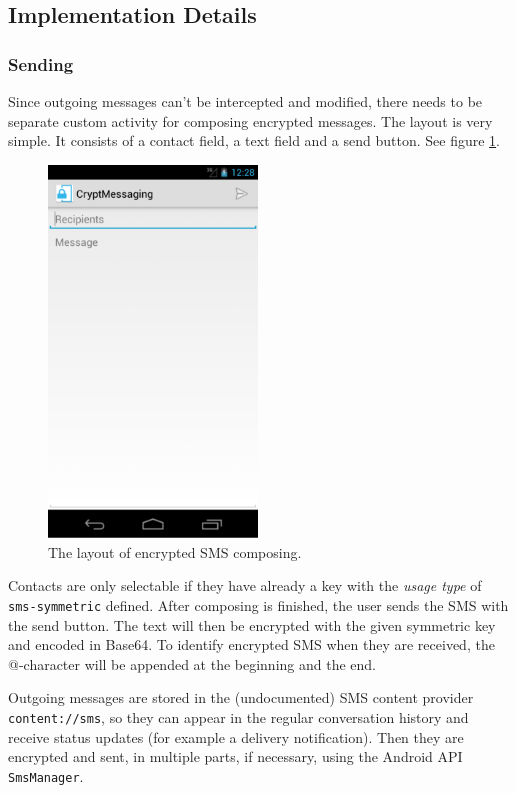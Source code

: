 \documentclass[a4paper,bibtotoc,draft]{scrartcl}
\begin{document}
	\subsection{Implementation Details}
		\subsubsection{Sending}
			Since outgoing messages can't be intercepted and modified, there needs to be separate custom activity for composing encrypted messages.  The layout is very simple. It consists of a contact field, a text field and a send button. See figure \ref{fig:compose}.
			\begin{figure}[h]
				\centering
					\includegraphics[width=15em]{crypt-compose.png}
				\caption{The layout of encrypted SMS composing.}
				\label{fig:compose}
			\end{figure}

			Contacts are only selectable if they have already a key with the {\em usage type} of \linebreak \texttt{sms-symmetric} defined. After composing is finished, the user sends the SMS with the send button. The text will then be encrypted with the given symmetric key and encoded in Base64. To identify encrypted SMS when they are received, the @-character will be appended at the beginning and the end.

			Outgoing messages are stored in the (undocumented) SMS content provider \linebreak %
			\texttt{content://sms}, so they can appear in the regular conversation history and receive status updates (for example a delivery notification). Then they are encrypted and sent, in multiple parts, if necessary, using the Android API \texttt{SmsManager}.
\end{document}
